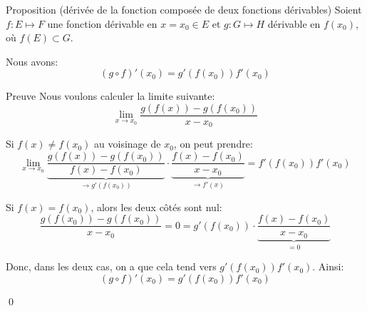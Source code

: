 \documentclass[a4paper]{article}
\begin{document}
\begin{parag}{Proposition (dérivée de la fonction composée de deux fonctions dérivables)}
    Soient $f : E\mapsto F$ une fonction dérivable en $x = x_0 \in E$ et $g : G \mapsto H$ dérivable en $f\left(x_0\right)$, où $f\left(E\right) \subset G$.

    Nous avons:
    \[\left(g \circ f\right)'\left(x_0\right) = g'\left(f\left(x_0\right)\right)f'\left(x_0\right)\]

    \begin{subparag}{Preuve}
        Nous voulons calculer la limite suivante:
        \[\lim_{x \to x_0} \frac{g\left(f\left(x\right)\right) - g\left(f\left(x_0\right)\right)}{x - x_0}\]

        Si $f\left(x\right) \neq f\left(x_0\right)$ au voisinage de $x_0$, on peut prendre:
        \[\lim_{x \to x_0} \underbrace{\frac{g\left(f\left(x\right)\right) - g\left(f\left(x_0\right)\right)}{f\left(x\right) - f\left(x_0\right)}}_{\to g'\left(f\left(x_0\right)\right)} \cdot \underbrace{\frac{f\left(x\right) - f\left(x_0\right)}{x - x_0}}_{\to f'\left(x\right)} = f'\left(f\left(x_0\right)\right)f'\left(x_0\right)\]

        Si $f\left(x\right) = f\left(x_0\right)$, alors les deux côtés sont nul:
        \[\frac{g\left(f\left(x_0\right)\right) - g\left(f\left(x_0\right)\right)}{x - x_0} = 0 = g'\left(f\left(x_0\right)\right) \cdot \underbrace{\frac{f\left(x\right) - f\left(x_0\right)}{x - x_0}}_{= 0}\]

        Donc, dans les deux cas, on a que cela tend vers $g'\left(f\left(x_0\right)\right)f'\left(x_0\right)$. Ainsi:
        \[\left(g \circ f\right)'\left(x_0\right) = g'\left(f\left(x_0\right)\right)f'\left(x_0\right)\]

        \qed
    \end{subparag}
\end{parag}
\end{document}
